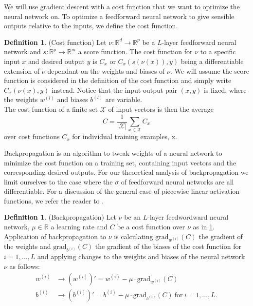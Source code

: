 \documentclass{article}
\theoremstyle{definition}
\newtheorem{definition}[theorem]{Definition}
\newtheorem{remark}[theorem]{Remark}
\begin{document}
We will use gradient descent with a cost function that we want to optimize the neural network on. To optimize a feedforward neural network to give sensible outputs relative to the inputs, we define the cost function.

\begin{definition}(Cost function)
\label{def:cost_fct}
Let $\nu : \mathbb{R}^{d} \to \mathbb{R}^{p}$ be a $L$-layer feedforward neural network and $s : \mathbb{R}^{p} \to \mathbb{R}^{m}$ a score function. The cost function for $\nu$ to a specific input $x$ and desired output $y$ is $C_{x}$ or $C_{x}(s(\nu(x)), y)$ being a differentiable extension of $\nu$ dependant on the weights and biases of $\nu$. We will assume the score function is considered in the definition of the cost function and simply write $C_{x}(\nu(x), y)$ instead. Notice that the input-output pair $(x, y)$ is fixed, where the weights $w^{(l)}$ and biases $b^{(l)}$ are variable. \\
The cost function of a finite set $\mathcal{X}$ of input vectors is then the average $$C=\frac{1}{|\mathcal{X}|}\sum_{x \in \mathcal{X}}C_{x}$$
over cost functions $C_{x}$ for individual training examples, x.
\end{definition}


Backpropagation is an algorithm to tweak weights of a neural network to minimize the cost function on a training set, containing input vectors and the corresponding desired outputs. For our theoretical analysis of backpropagation we limit ourselves to the case where the $\sigma$ of feedforward neural networks are all differentiable. For a discussion of the general case of piecewise linear activation functions, we refer the reader to \cite{agostinelli2014learning}.

\begin{definition}(Backpropagation)
Let $\nu$ be an $L$-layer feedwordward neural network, $\mu \in \mathbb{R}$ a learning rate and $C$ be a cost function over $\nu$ as in \ref{def:cost_fct}. Application of backpropagation to $\nu$ is calculating $\text{grad}_{w^{(i)}}(C)$ the gradient of the weights and $\text{grad}_{b^{(i)}}(C)$ the gradient of the biases of the cost function for $i = 1, \dots , L$ and applying changes to the weights and biases of the neural network $\nu$ as follows:
\begin{align*}
w^{(i)} &\to (w^{(i)})' = w^{(i)}-\mu \cdot \text{grad}_{w^{(i)}}(C) \\
b^{(i)} &\to (b^{(i)})' = b^{(i)}-\mu \cdot \text{grad}_{b^{(i)}}(C) \ \text{for} \ i = 1, \dots, L.
\end{align*}
\end{definition}
\end{document}
